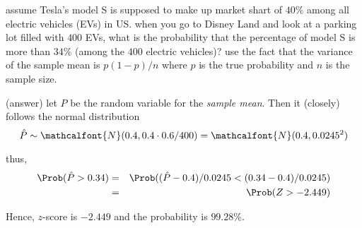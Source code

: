 \documentclass[17pt,landscape]{foils}
\newcommand\normal{\mathcalfont{N}}
\begin{document}
{%

\bit
	\item assume Tesla's model S is supposed to make up market shart of $40$\% among all electric vehicles (EVs) in US.
		when you go to Disney Land and look at a parking lot filled with $400$ EVs,
		what is the probability that the percentage of model S is more than $34$\% (among the $400$ electric vehicles)?
		use the fact that the variance of the sample mean is $p(1-p)/n$
		where $p$ is the true probability and $n$ is the sample size.


	\bit
		\vitem (answer) let $\hat{P}$ be the random variable for the \emph{sample mean}. Then
			it (closely) follows the normal distribution
			\[
				\hat{P} \sim \normal ( 0.4, 0.4 \cdot 0.6 / 400)
				= \normal ( 0.4, 0.0245^2)
			\]

			thus,
			\begin{eqnarray*}
				\Prob(\hat{P} > 0.34) &=& \Prob((\hat{P} - 0.4)/0.0245 < (0.34-0.4)/0.0245)
				\\
				&=& \Prob(Z > -2.449)
			\end{eqnarray*}

			Hence, $z$-score is $-2.449$ and the probability is $99.28$\%.
	\eit
\eit
}{}
\end{document}
